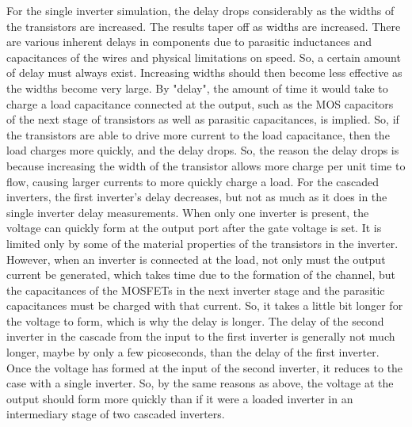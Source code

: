 For the single inverter simulation, the delay drops considerably as the widths of the transistors are increased. The results taper off as widths are increased. There are various inherent delays in components due to parasitic inductances and capacitances of the wires and physical limitations on speed. So, a certain amount of delay must always exist. Increasing widths should then become less effective as the widths become very large.
By "delay", the amount of time it would take to charge a load capacitance connected at the output, such as the MOS capacitors of the next stage of transistors as well as parasitic capacitances, is implied. So, if the transistors are able to drive more current to the load capacitance, then the load charges more quickly, and the delay drops. So, the reason the delay drops is because increasing the width of the transistor allows more charge per unit time to flow, causing larger currents to more quickly charge a load.
For the cascaded inverters, the first inverter's delay decreases, but not as much as it does in the single inverter delay measurements. When only one inverter is present, the voltage can quickly form at the output port after the gate voltage is set. It is limited only by some of the material properties of the transistors in the inverter. However, when an inverter is connected at the load, not only must the output current be generated, which takes time due to the formation of the channel, but the capacitances of the MOSFETs in the next inverter stage and the parasitic capacitances must be charged with that current. So, it takes a little bit longer for the voltage to form, which is why the delay is longer.
The delay of the second inverter in the cascade from the input to the first inverter is generally not much longer, maybe by only a few picoseconds, than the delay of the first inverter. Once the voltage has formed at the input of the second inverter, it reduces to the case with a single inverter. So, by the same reasons as above, the voltage at the output should form more quickly than if it were a loaded inverter in an intermediary stage of two cascaded inverters. \\

